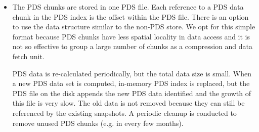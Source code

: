 \begin{itemize}
\item The PDS chunks are  stored in one PDS file. 
Each reference to a PDS data chunk in the PDS index is the offset within the PDS file.
There is an option to use the data structure similar to the non-PDS store. We opt for this simple format because
PDS chunks have less spatial locality in data access and it is not so effective to group a large number of chunks
as a compression and data fetch unit. 

PDS data is re-calculated periodically, but 
the total data size is small.  When
a new PDS data  set is computed, in-memory PDS index is replaced, but 
the PDS file on the disk appends the  new PDS data identified and the growth of this file is very slow. 
The old data is not removed because they can still be referenced by the existing snapshots. 
A periodic cleanup is conducted  to remove unused PDS chunks (e.g. in every few months). 
\end{itemize}



